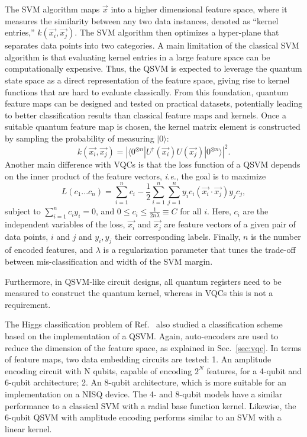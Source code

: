 The SVM algorithm maps $\vec{x}$ into a higher dimensional feature space, where it measures the similarity between any two data instances, denoted as ``kernel entries,'' $k(\vec{x_{i}}, \vec{x_{j}})$.
The SVM algorithm then optimizes a hyper-plane that separates data points into two categories.
A main limitation of the classical SVM algorithm is that evaluating kernel entries in a large feature space can be computationally expensive.
Thus, the QSVM is expected to leverage the quantum state space as a direct representation of the feature space, giving rise to  kernel functions that are hard to evaluate classically.
From this foundation, quantum feature maps can be designed and tested on practical datasets, potentially leading to better classification results than classical feature maps and kernels.
Once a suitable quantum feature map is chosen, the kernel matrix element is constructed by sampling the probability of measuring $|0\rangle$: 
%
\begin{equation}
    k(\vec{x_{i}}, \vec{x_{j}}) = |\langle 0^{\otimes n}|U^{\dagger}(\vec{x_{i}})U(\vec{x_{j}})|0^{\otimes n} \rangle|^{2}.
\end{equation}
%
Another main difference with VQCs is that the loss function of a QSVM depends on the inner product of the feature vectors, \textit{i.e.}, the goal is to maximize
%
\begin{equation}
    L(c_{1}...c_{n}) = \sum_{i=1}^{n}c_{i} - \frac{1}{2}\sum_{i=1}^{n}\sum_{j=1}^{n}y_{i}c_{i}(\vec{x_{i}}\cdot\vec{x_{j}})y_{j}c_{j},
\end{equation}
%
subject to $\sum_{i=1}^{n}c_{i}y_{i}=0$, and $0\leq c_{i} \leq \frac{1}{2n\lambda} \equiv C$ for all $i$.
Here, $c_{i}$ are the independent variables of the loss, $\vec{x_{i}}$ and $\vec{x_{j}}$ are feature vectors of a given pair of data points, $i$ and $j$ and $y_{i},y_{j}$ their corresponding labels.
Finally, $n$ is the number of encoded features, and $\lambda$ is a regularization parameter that tunes the trade-off between mis-classification and width of the SVM margin. 

Furthermore, in QSVM-like circuit designs, all quantum registers need to be measured to construct the quantum kernel, whereas in VQCs this is not a requirement.

The Higgs classification problem of Ref.~\cite{Belis2021} also studied a classification scheme based on the implementation of a QSVM.
Again, auto-encoders are used to reduce the dimension of the feature space, as explained in Sec.~\ref{sec:vqc}.
In terms of feature maps, two data embedding circuits are tested: 1. An amplitude encoding circuit with N qubits, capable of encoding $2^N$ features, for a 4-qubit and 6-qubit architecture; 2. An 8-qubit architecture, which is more suitable for an implementation on a NISQ device.
The 4- and 8-qubit models have a similar performance to a classical SVM with a radial base function kernel.
Likewise, the 6-qubit QSVM with amplitude encoding performs similar to an SVM with a linear kernel.

